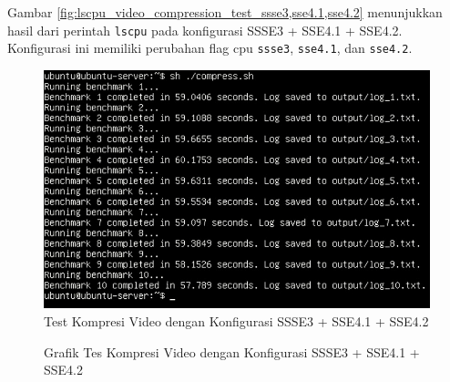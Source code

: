 Gambar \ref{fig:lscpu_video_compression_test_ssse3,sse4.1,sse4.2} menunjukkan hasil dari perintah \texttt{lscpu} pada konfigurasi SSSE3 + SSE4.1 + SSE4.2. Konfigurasi ini memiliki perubahan flag cpu \texttt{ssse3}, \texttt{sse4.1}, dan \texttt{sse4.2}.

\begin{figure}
    \centering
    \includegraphics[width=1\textwidth]
    {assets/pics/video-compression-test/ssse3,sse4.1,sse4.2.jpeg}
    \caption{Test Kompresi Video dengan Konfigurasi SSSE3 + SSE4.1 + SSE4.2}
    \label{fig:video_compression_test_ssse3,sse4.1,sse4.2}
\end{figure}

\begin{figure}
    \centering
    \caption{Grafik Tes Kompresi Video dengan Konfigurasi SSSE3 + SSE4.1 + SSE4.2}
    \label{fig:video_compression_test_ssse3,sse4.1,sse4.2_graph}
\end{figure}

